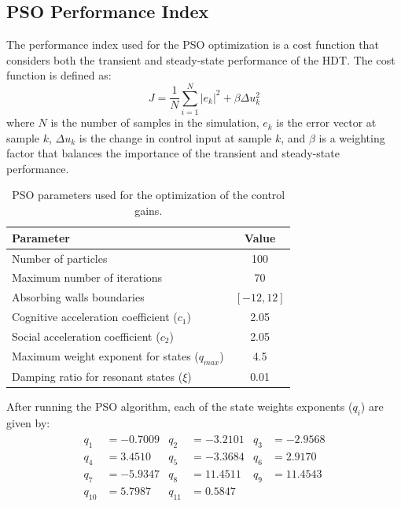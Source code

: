 \subsection{PSO Performance Index}

The performance index used for the PSO optimization is a cost function that considers both the transient and steady-state performance of the HDT. The cost function is defined as:
\begin{equation}
    J = \dfrac{1}{N} \sum_{i=1}^{N} |e_k|^2 + \beta \Delta u_k^2
\end{equation}
where $N$ is the number of samples in the simulation, $e_k$ is the error vector at sample $k$, $\Delta u_k$ is the change in control input at sample $k$, and $\beta$ is a weighting factor that balances the importance of the transient and steady-state performance.

\begin{table}[h!]
    \centering
    \caption{PSO parameters used for the optimization of the control gains.}
    \label{tab:PSO_Parameters}
    \begin{tabular}{|l|c|}
        \hline
        \textbf{Parameter} & \textbf{Value}\\
        \hline\hline
        Number of particles & 100\\
        Maximum number of iterations & 70\\
        Absorbing walls boundaries & $[-12, 12]$\\
        Cognitive acceleration coefficient ($c_1$) & 2.05\\
        Social acceleration coefficient ($c_2$) & 2.05\\
        Maximum weight exponent for states ($q_{max}$) & 4.5\\
        Damping ratio for resonant states ($\xi$) & 0.01\\
        \hline
    \end{tabular}
\end{table}

After running the PSO algorithm, each of the state weights exponents ($q_i$) are given by:
\begin{align}
    \begin{aligned}
        q_1 &= -0.7009 & q_2 &= -3.2101 & q_3 &= -2.9568\\
        q_4 &= 3.4510 & q_5 &= -3.3684 & q_6 &= 2.9170\\
        q_7 &= -5.9347 & q_8 &= 11.4511 & q_9&= 11.4543\\
        q_{10} &= 5.7987 & q_{11} &= 0.5847
    \end{aligned}
\end{align}

